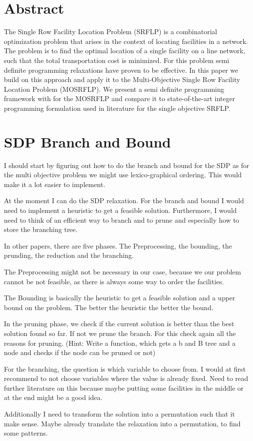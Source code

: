 \documentclass[a4paper]{article}
\begin{document}
\section*{Abstract}
The Single Row Facility Location Problem (SRFLP) is a combinatorial optimization problem that arises in the context of locating facilities in a network. The problem is to find the optimal location of a single facility on a line network, such that the total transportation cost is minimized. For this problem semi definite programming relaxations have proven to be effective. In this paper we build on this approach and apply it to the Multi-Objective Single Row Facility Location Problem (MOSRFLP). We present a semi definite programming framework with for the MOSRFLP and compare it to state-of-the-art integer programming formulation used in literature for the single objective SRFLP. 


\section*{SDP Branch and Bound}

I should start by figuring out how to do the branch and bound for the SDP as for the multi objective problem we might use lexico-graphical ordering. This would make it a lot easier to implement. 

At the moment I can do the SDP relaxation. For the branch and bound I would need to implement a heuristic to get a feasible solution. Furthermore, I would need to think of an efficient way to branch and to prune and especially how to store the branching tree. 

In other papers, there are five phases. The Preprocessing, the bounding, the prunding, the reduction and the branching.

The Preprocessing might not be necessary in our case, because we our problem cannot be not feasible, as there is always some way to order the facilities. 

The Bounding is basically the heuristic to get a feasible solution and a upper bound on the problem. The better the heuristic the better the bound.

In the pruning phase, we check if the current solution is better than the best solution found so far. If not we prune the branch. For this check again all the reasons for pruning. (Hint: Write a function, which gets a b and B tree and a node and checks if the node can be pruned or not)

For the branching, the question is which variable to choose from. I would at first recommend to not choose variables where the value is already fixed. Need to read further literature on this because maybe putting some facilities in the middle or at the end might be a good idea. 

Additionally I need to transform the solution into a permutation such that it make sense. Maybe already translate the relaxation into a permutation, to find some patterns. 
\end{document}
